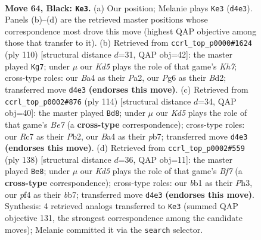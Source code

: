 \documentclass[11pt]{article}
\begin{document}
\clearpage

\begin{figure}[p]\centering
\begin{subfigure}{0.46\textwidth}\centering
\resizebox{\linewidth}{!}{%
\newchessgame
\chessboard[
  setfen={8/2r2p1p/6p1/4P3/bn1k1Pp1/6K1/3N3P/1B6 b - - 19 64},
  showmover=false,
  pgfstyle=straightmove, color=movearrow, markmove={d4-e3}
]}
\caption{}
\end{subfigure}\hfill
\begin{subfigure}{0.46\textwidth}\centering
\resizebox{\linewidth}{!}{%
\newchessgame
\chessboard[
  setfen={8/5p1K/p3k1p1/1pb1P3/5P2/1P5P/P2B4/8 w - - 47 56},
  showmover=false,
  pgfstyle=straightmove, color=movearrow, markmove={h7-g7}
]}
\caption{}
\end{subfigure}
\\[4pt]
\begin{subfigure}{0.46\textwidth}\centering
\resizebox{\linewidth}{!}{%
\newchessgame
\chessboard[
  setfen={8/1p1bB1p1/5p1k/6pP/4P1P1/5P2/1P3K2/8 w - - 35 58},
  showmover=false,
  pgfstyle=straightmove, color=movearrow, markmove={e7-d8}
]}
\caption{}
\end{subfigure}\hfill
\begin{subfigure}{0.46\textwidth}\centering
\resizebox{\linewidth}{!}{%
\newchessgame
\chessboard[
  setfen={3n4/1b3B2/4p3/kp2P3/7p/P1KN3P/6P1/8 w - - 1 70},
  showmover=false,
  pgfstyle=straightmove, color=movearrow, markmove={f7-e8}
]}
\caption{}
\end{subfigure}
\caption{\textbf{Move 64, Black: \texttt{Ke3}.} (a) Our position; Melanie plays \texttt{Ke3} (\texttt{d4e3}). Panels (b)--(d) are the retrieved master positions whose correspondence most drove this move (highest QAP objective among those that transfer to it). (b) Retrieved from \texttt{ccrl\_top\_p0000\#1624} (ply 110) [structural distance $d$=31, QAP obj=42]: the master played \texttt{Kg7}; under $\mu$ our \emph{Kd5} plays the role of that game's \emph{Kh7}; cross-type roles: our \emph{B}a4 as their \emph{P}a2, our \emph{P}g6 as their \emph{B}d2; transferred move \texttt{d4e3} \textbf{(endorses this move)}. (c) Retrieved from \texttt{ccrl\_top\_p0002\#876} (ply 114) [structural distance $d$=34, QAP obj=40]: the master played \texttt{Bd8}; under $\mu$ our \emph{Kd5} plays the role of that game's \emph{Be7} (a \textbf{cross-type} correspondence); cross-type roles: our \emph{R}c7 as their \emph{P}b2, our \emph{B}a4 as their \emph{p}b7; transferred move \texttt{d4e3} \textbf{(endorses this move)}. (d) Retrieved from \texttt{ccrl\_top\_p0002\#559} (ply 138) [structural distance $d$=36, QAP obj=11]: the master played \texttt{Be8}; under $\mu$ our \emph{Kd5} plays the role of that game's \emph{Bf7} (a \textbf{cross-type} correspondence); cross-type roles: our \emph{b}b1 as their \emph{P}h3, our \emph{p}f4 as their \emph{b}b7; transferred move \texttt{d4e3} \textbf{(endorses this move)}. Synthesis: 4 retrieved analogs transferred to \texttt{Ke3} (summed QAP objective 131, the strongest correspondence among the candidate moves); Melanie committed it via the \texttt{search} selector.}
\label{fig:thought-m127}
\end{figure}
\end{document}
